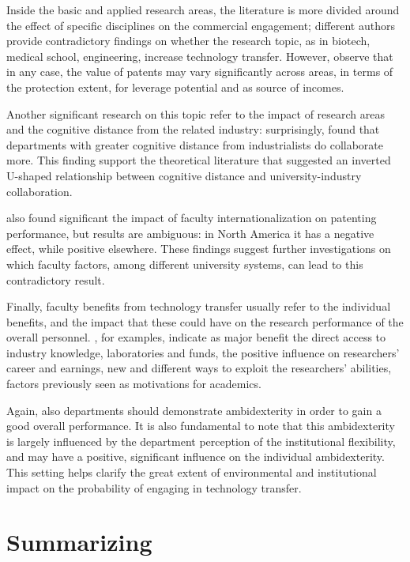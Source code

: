 Inside the basic and applied research areas, the literature is more divided around the effect of specific disciplines on the commercial engagement; different authors provide contradictory findings on whether the research topic, as in biotech, medical school, engineering, increase technology transfer. However, \citet{OwenSmith2001} observe that in any case, the value of patents may vary significantly across areas, in terms of the protection extent, for leverage potential and as source of incomes. 

Another significant research on this topic refer to the impact of research areas and the cognitive distance from the related industry: surprisingly, \citet{Muscio2010} found that departments with greater cognitive distance from industrialists do collaborate more. This finding support the theoretical literature that suggested an inverted U-shaped relationship between cognitive distance and university-industry collaboration.

\citet{Wong2010} also found significant the impact of faculty internationalization on patenting performance, but results are ambiguous: in North America it has a negative effect, while positive elsewhere. These findings suggest further investigations on which faculty factors, among different university systems, can lead to this contradictory result. 

Finally, faculty benefits from technology transfer usually refer to the individual benefits, and the impact that these could have on the research performance of the overall personnel. \citet{Baldini2007}, for examples, indicate as major benefit the direct access to industry knowledge, laboratories and funds, the positive influence on researchers' career and earnings, new and different ways to exploit the researchers' abilities, factors previously seen as motivations for academics.

Again, also departments should demonstrate ambidexterity in order to gain a good overall performance. It is also fundamental to note that this ambidexterity is largely influenced by the department perception of the institutional flexibility, and may have a positive, significant influence on the individual ambidexterity. This setting helps clarify the great extent of environmental and institutional impact on the probability of engaging in technology transfer.

\section{Summarizing}